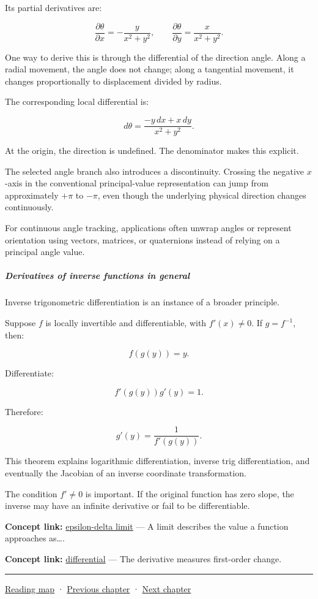 Its partial derivatives are:

\[
\boxed{ \frac{\partial\theta}{\partial x} =-\frac{y}{x^2+y^2}, \qquad \frac{\partial\theta}{\partial y} =\frac{x}{x^2+y^2} }.
\]

One way to derive this is through the differential of the direction angle. Along a radial movement, the angle does not change; along a tangential movement, it changes proportionally to displacement divided by radius.

The corresponding local differential is:

\[
d\theta=\frac{-y\,dx+x\,dy}{x^2+y^2}.
\]

At the origin, the direction is undefined. The denominator makes this explicit.

The selected angle branch also introduces a discontinuity. Crossing the negative \(x\)-axis in the conventional principal-value representation can jump from approximately \(+\pi\) to \(-\pi\), even though the underlying physical direction changes continuously.

For continuous angle tracking, applications often unwrap angles or represent orientation using vectors, matrices, or quaternions instead of relying on a principal angle value.

\subparagraph{Derivatives of inverse functions in general}\label{01-foundations-i-ch020-derivatives-of-inverse-functions-in-general}

\hypertarget{01-foundations-i-ch020-derivatives-of-inverse-functions-in-general}{}

Inverse trigonometric differentiation is an instance of a broader principle.

Suppose \(f\) is locally invertible and differentiable, with \(f'(x)\ne0\). If \(g=f^{-1}\), then:

\[
f(g(y))=y.
\]

Differentiate:

\[
f'(g(y))g'(y)=1.
\]

Therefore:

\[
\boxed{g'(y)=\frac1{f'(g(y))}}.
\]

This theorem explains logarithmic differentiation, inverse trig differentiation, and eventually the Jacobian of an inverse coordinate transformation.

The condition \(f'\ne0\) is important. If the original function has zero slope, the inverse may have an infinite derivative or fail to be differentiable.

\textbf{Concept link:} \hyperref[01-foundations-i-ch020-functions-limits-continuity-and-scalar-change]{epsilon-delta limit} --- A limit describes the value a function approaches as\ldots.

\textbf{Concept link:} \hyperref[01-foundations-i-ch020-functions-limits-continuity-and-scalar-change]{differential} --- The derivative measures first-order change.

\begin{center}\rule{0.5\linewidth}{0.5pt}\end{center}

\hyperref[volume-reading-map]{Reading map} · \hyperref[01-foundations-i-ch019-coordinate-frames-and-linear-systems]{Previous chapter} · \hyperref[02-foundations-ii-ch021-multivariable-derivatives-and-sensitivity]{Next chapter}
